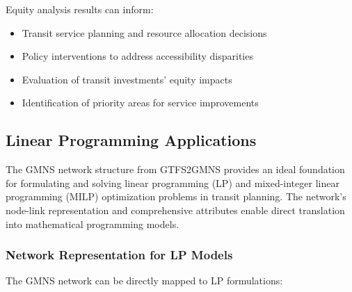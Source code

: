 \documentclass[11pt,a4paper]{article}
\begin{document}
Equity analysis results can inform:
\begin{itemize}
    \item Transit service planning and resource allocation decisions
    \item Policy interventions to address accessibility disparities
    \item Evaluation of transit investments' equity impacts
    \item Identification of priority areas for service improvements
\end{itemize}

\subsection{Linear Programming Applications}

The GMNS network structure from GTFS2GMNS provides an ideal foundation for formulating and solving linear programming (LP) and mixed-integer linear programming (MILP) optimization problems in transit planning. The network's node-link representation and comprehensive attributes enable direct translation into mathematical programming models.

\subsubsection{Network Representation for LP Models}

The GMNS network can be directly mapped to LP formulations:
\end{document}

